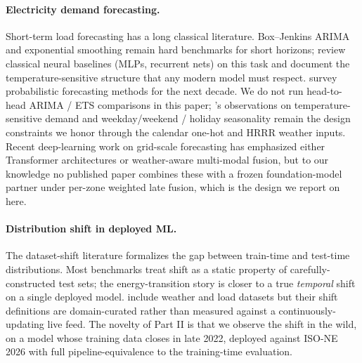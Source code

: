 \paragraph{Electricity demand forecasting.} Short-term load forecasting has a long classical literature. Box--Jenkins ARIMA \citep{box1976time} and exponential smoothing remain hard benchmarks for short horizons; \citet{hippert2001neural} review classical neural baselines (MLPs, recurrent nets) on this task and document the temperature-sensitive structure that any modern model must respect. \citet{hong2016probabilistic} survey probabilistic forecasting methods for the next decade. We do not run head-to-head ARIMA / ETS comparisons in this paper; \citet{hippert2001neural}'s observations on temperature-sensitive demand and weekday/weekend / holiday seasonality remain the design constraints we honor through the calendar one-hot and HRRR weather inputs. Recent deep-learning work on grid-scale forecasting has emphasized either Transformer architectures or weather-aware multi-modal fusion, but to our knowledge no published paper combines these with a frozen foundation-model partner under per-zone weighted late fusion, which is the design we report on here.

\paragraph{Distribution shift in deployed ML.} The dataset-shift literature \citep{quinonero2009dataset,koh2021wilds} formalizes the gap between train-time and test-time distributions. Most benchmarks treat shift as a static property of carefully-constructed test sets; the energy-transition story is closer to a true \emph{temporal} shift on a single deployed model. \citet{koh2021wilds} include weather and load datasets but their shift definitions are domain-curated rather than measured against a continuously-updating live feed. The novelty of Part II is that we observe the shift in the wild, on a model whose training data closes in late 2022, deployed against ISO-NE 2026 with full pipeline-equivalence to the training-time evaluation.
